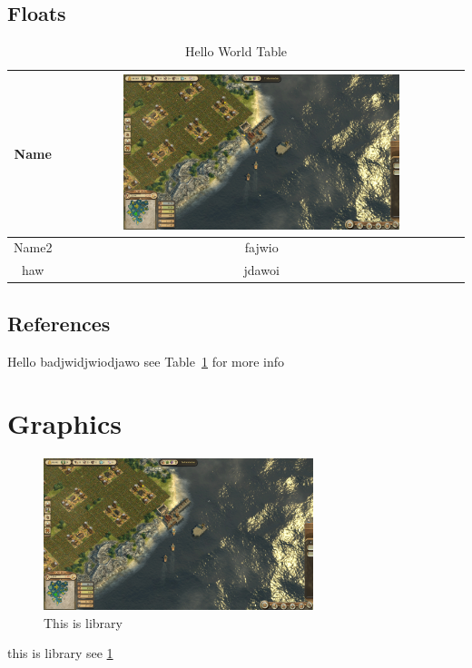 \documentclass[11pt]{article}
\begin{document}
    \subsection{Floats}
    \begin{table}[htbp]
        \caption{Hello World Table}
        \begin{center}
            \begin{tabular}{|c||c|}
                \hline
                Name  & \includegraphics[width=0.7\textwidth]{Anno 1404 - History Edition2021-2-2-1-53-42} \\
                \hline
                Name2 & fajwio             \\
                \hline
                haw   & jdawoi             \\
                \hline
            \end{tabular}
        \end{center}
        \label{tab:Important Stuff}
    \end{table}

    \subsection{References}
    Hello badjwidjwiodjawo see Table~\ref{tab:Important Stuff} for more info

    \section{Graphics}



    \begin{figure}[htbp]
        \begin{center}
            \includegraphics[width=0.7\textwidth]{Anno 1404 - History Edition2021-2-2-1-53-42}
            \caption{This is library}
        \end{center}
        \label{fig:Images}
    \end{figure}

    this is library see \ref{fig:Images}
\end{document}
